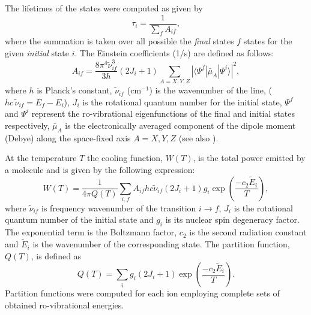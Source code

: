 \documentclass[prb,preprint,12pt,superscriptaddress,floatfix,bibnotes,nofootinbib,unsortedaddress,preprintnumbers,amsmath,amssymb]{revtex4}
\newcommand{\cm}{cm$^{-1}$}
\newcommand{\2}{$_{2}$}
\newcommand{\3}{$_{3}$}
\begin{document}
The lifetimes of the states were computed as given by\cite{16TeHuNa.method}
\begin{equation}
  \tau_i = \frac{1}{\sum_f A_{if}},
\end{equation}
where the summation is taken over all possible the \textit{final} states $f$
states for the given \textit{initial} state $i$. The Einstein coefficients (1/s)
are defined as follows:
\begin{equation}
A_{if} = \frac{8\pi^{4}\tilde{\nu}_{if}^{3}}{3h}(2J_{i} + 1)\sum_{A=X,Y,Z}
|\langle \Psi^{f} | \bar{\mu}_{A} | \Psi^{i} \rangle |^{2},
\label{e:A}
\end{equation}
where  $h$ is Planck's constant, $\tilde{\nu}_{if}$ (\cm) is the wavenumber of
the line, (\(hc \,
\tilde{\nu}_{if} = E_{f} -E_{i}\)), $J_{i}$ is the rotational quantum number for
the initial state, \(\Psi^{f}\) and \(\Psi^{i}\) represent the ro-vibrational
eigenfunctions of the final and initial states respectively, \(\bar{\mu}_{A}\)
is the electronically averaged component of the dipole moment (Debye) along the
space-fixed
axis \(A=X,Y,Z\) (see also \citet{05YuThCa.method}).

At the temperature $T$ the cooling function, $W(T)$, is the total power emitted
by a molecule and is given by the following expression:\cite{16TeYuAl.db}
\begin{equation}
\label{e:cooling}
  W(T) = \frac{1}{4\pi Q(T)} \sum_{i,f} A_{if} h c \tilde{\nu}_{if} (2 J_i+1)
g_i \exp\left( \frac{-c_2 \tilde{E}_i}{T} \right) ,
\end{equation}
where $\tilde{\nu}_{if}$ is frequency wavenumber of the transition $i \to f$,
$J_i$ is the rotational quantum number of the initial state and $g_i$ is its
nuclear spin degeneracy factor. The exponential term is the Boltzmann factor,
$c_2$ is the second radiation constant and $\tilde{E}_i$ is the wavenumber of
the corresponding state. The partition function, $Q(T)$, is defined as
\begin{equation}
  Q(T) = \sum_{i} g_i  (2J_i+1) \exp\left( \frac{-c_2 \tilde{E}_i}{T} \right) .
\end{equation}
Partition functions were computed for each ion employing complete sets of
obtained ro-vibrational energies.
\end{document}
